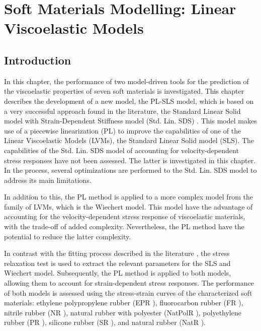 \chapter{Soft Materials Modelling: Linear Viscoelastic Models} \label{sec:ChapterModellingLVM}


\section{Introduction}

In this chapter, the performance of two model-driven tools for the prediction of the viscoelastic properties of seven soft materials is investigated. This chapter describes the development of a new model, the PL-SLS model, which is based on a very successful approach found in the literature, the Standard Linear Solid model with Strain-Dependent Stiffness model (Std. Lin. SDS) \cite{austin2015control}. This model makes use of a piecewise linearization (PL) to improve the capabilities of one of the Linear Viscoelastic Models (LVMs), the Standard Linear Solid model (SLS). The capabilities of the Std. Lin. SDS model of accounting for velocity-dependent stress responses have not been assessed. The latter is investigated in this chapter. In the process, several optimizations are performed to the Std. Lin. SDS model to address its main limitations.

In addition to this, the PL method is applied to a more complex model from the family of LVMs, which is the Wiechert model. This model have the advantage of accounting for the velocity-dependent stress response of viscoelastic materials, with the trade-off of added complexity. Nevertheless, the PL method have the potential to reduce the latter complexity.

In contrast with the fitting process described in the literature \cite{austin2015control}, the stress relaxation test is used to extract the relevant parameters for the SLS and Wiechert model. Subsequently, the PL method is applied to both models, allowing them to account for strain-dependent stress responses. The performance of both models is assessed using the stress-strain curves of the characterized soft materials: ethylene polypropylene rubber (EPR \cite{EPRubber2019}), fluorocarbon rubber (FR \cite{FRubber2019}), nitrile rubber (NR \cite{NRubber2019}), natural rubber with polyester (NatPolR \cite{NatPolRubber2019}), polyethylene  rubber  (PR \cite{PRubber2019}), silicone  rubber  (SR \cite{SRubber2019}), and natural rubber (NatR \cite{NatRubber2019}).

